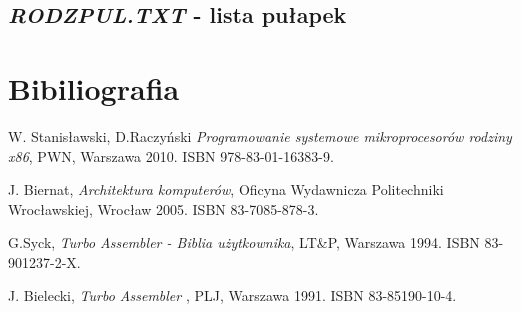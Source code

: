 \documentclass[a4paper,12pt]{article}
\begin{document}
\subsection{\textit{RODZPUL.TXT} - lista pułapek}



	
\section{Bibiliografia}
\begin{thebibliography}{999}
 W. Stanisławski, D.Raczyński 
{\em Programowanie systemowe mikroprocesorów rodziny x86},
PWN, Warszawa 2010. ISBN 978-83-01-16383-9.

 J. Biernat,
{\em Architektura komputerów}, 
Oficyna Wydawnicza Politechniki Wrocławskiej, Wrocław 2005. ISBN 83-7085-878-3.

 G.Syck,
{\em Turbo Assembler - Biblia użytkownika}, 
LT\&P, Warszawa 1994. ISBN 83-901237-2-X.

 J. Bielecki,
{\em Turbo Assembler }, 
PLJ, Warszawa 1991. ISBN 83-85190-10-4.

\end{thebibliography}	
\end{document}
